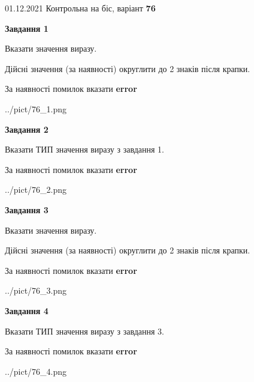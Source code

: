 \documentclass[11pt, ukrainian]{article}
\begin{document}
{01.12.2021 Контрольна на біс, варіант  \No \textbf { 76 }\par}
{
\begin {large}
{\begin {center}\textbf{Завдання 1}\end {center}}\par
Вказати значення виразу. \par
Дійсні значення (за наявності) округлити до 2 знаків після крапки. \par
За наявності помилок вказати \textbf{error}

\begin{center}
	{../pict/76_1.png}
\end{center}
\newpage

{\begin {center}\textbf{Завдання 2}\end {center}}\par
Вказати ТИП значення виразу з завдання 1. \par
За наявності помилок вказати \textbf{error}

\begin{center}
	{../pict/76_2.png}
\end{center}
\newpage

{\begin {center}\textbf{Завдання 3}\end {center}}\par
Вказати значення виразу. \par
Дійсні значення (за наявності) округлити до 2 знаків після крапки. \par
За наявності помилок вказати \textbf{error}

\begin{center}
	{../pict/76_3.png}
\end{center}
\newpage

{\begin {center}\textbf{Завдання 4}\end {center}}\par
Вказати ТИП значення виразу з завдання 3. \par
За наявності помилок вказати \textbf{error}

\begin{center}
	{../pict/76_4.png}
\end{center}
\newpage


\end{large}}
\end{document}
